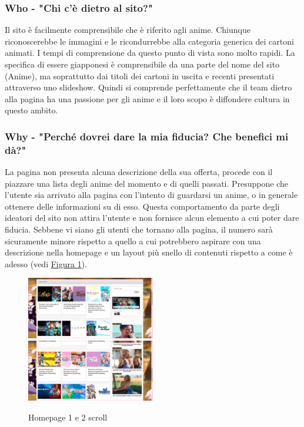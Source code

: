 \subsubsection{Who - "Chi c'è dietro al sito?"} \label{HWho}
Il sito è facilmente comprensibile che è riferito agli anime. Chiunque riconoscerebbe le immagini e le ricondurrebbe alla categoria generica dei cartoni animati. I tempi di comprensione da questo punto di vista sono molto rapidi. La specifica di essere giapponesi è comprensibile da una parte del nome del sito (Anime), ma soprattutto dai titoli dei cartoni in uscita e recenti presentati attraverso uno slideshow. Quindi si comprende perfettamente che il team dietro alla pagina ha una passione per gli anime e il loro scopo è diffondere cultura in questo ambito.

\subsubsection{Why - "Perché dovrei dare la mia fiducia? Che benefici mi dà?"} \label{HWhy}
La pagina non presenta alcuna descrizione della sua offerta, procede con il piazzare una lista degli anime del momento e di quelli passati. Presuppone che l'utente sia arrivato alla pagina con l'intento di guardarsi un anime, o in generale ottenere delle informazioni su di esso. Questa comportamento da parte degli ideatori del sito non attira l'utente e non fornisce alcun elemento a cui poter dare fiducia. Sebbene vi siano gli utenti che tornano alla pagina, il numero sarà sicuramente minore rispetto a quello a cui potrebbero aspirare con una descrizione nella homepage e un layout più snello di contenuti rispetto a come è adesso (vedi \hyperref[img2]{Figura \ref{img2}}).

\begin{figure}[H]
	\includegraphics[width=0.5\textwidth]{img/homepage02.png}
	\includegraphics[width=0.5\textwidth]{img/homepage03.png}
	\caption{Homepage 1 e 2 scroll} 
	\label{img2} 
\end{figure}

